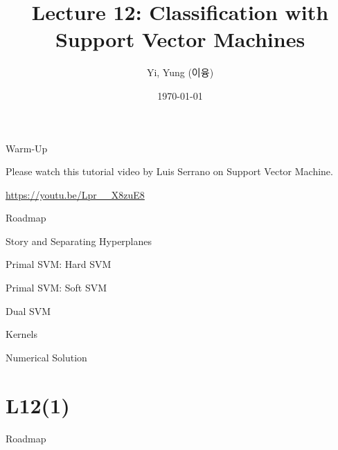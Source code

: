 \documentclass[handout,fleqn,aspectratio=169]{beamer}
\title[]{Lecture 12: Classification with Support Vector Machines}
\author{Yi, Yung (이융)}
\institute{Mathematics for Machine Learning\\ \url{https://yung-web.github.io/home/courses/mathml.html}
\\KAIST EE}
\date{\today}
\begin{document}





\begin{frame}{Warm-Up}

{\Large Please watch this tutorial video by Luis Serrano on Support Vector Machine.}

\bigskip

\bigskip

\url{https://youtu.be/Lpr__X8zuE8}

\end{frame}


\begin{frame}{Roadmap}

\plitemsep 0.1in

\bce[(1)] 

\item Story and Separating Hyperplanes 
\item Primal SVM: Hard SVM 
\item Primal SVM: Soft SVM 
\item Dual SVM 
\item Kernels 
\item Numerical Solution 

\ece
\end{frame}

\section{L12(1)}
\begin{frame}{Roadmap}

\plitemsep 0.1in

\bce[(1)] 

\item {}
\item {}

\ece
\end{frame}
\end{document}

